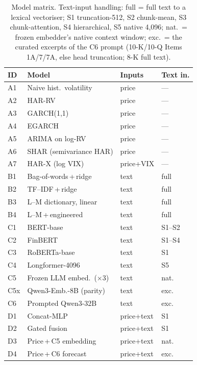 \begin{table}[t]
\centering
\small
\caption{Model matrix. Text-input handling: full = full text to a lexical vectoriser; S1 truncation-512, S2 chunk-mean, S3 chunk-attention, S4 hierarchical, S5 native 4{,}096; nat.\ = frozen embedder's native context window; exc.\ = the curated excerpts of the C6 prompt (10-K/10-Q Items 1A/7/7A, else head truncation; 8-K full text).}
\label{tab:models}
\setlength{\tabcolsep}{3pt}
\begin{tabular}{@{}llll@{}}
\toprule
\textbf{ID} & \textbf{Model} & \textbf{Inputs} & \textbf{Text in.} \\
\midrule
A1 & Naive hist.\ volatility & price & --- \\
A2 & HAR-RV & price & --- \\
A3 & GARCH(1,1) & price & --- \\
A4 & EGARCH & price & --- \\
A5 & ARIMA on log-RV & price & --- \\
A6 & SHAR (semivariance HAR) & price & --- \\
A7 & HAR-X (log VIX) & price+VIX & --- \\
\midrule
B1 & Bag-of-words\,+\,ridge & text & full \\
B2 & TF--IDF\,+\,ridge & text & full \\
B3 & L--M dictionary, linear & text & full \\
B4 & L--M\,+\,engineered & text & full \\
\midrule
C1 & BERT-base & text & S1--S2 \\
C2 & FinBERT & text & S1--S4 \\
C3 & RoBERTa-base & text & S1 \\
C4 & Longformer-4096 & text & S5 \\
C5 & Frozen LLM embed.\ ($\times$3) & text & nat. \\
C5x & Qwen3-Emb.-8B (parity) & text & exc. \\
C6 & Prompted Qwen3-32B & text & exc. \\
\midrule
D1 & Concat-MLP & price+text & S1 \\
D2 & Gated fusion & price+text & S1 \\
D3 & Price\,+\,C5 embedding & price+text & nat. \\
D4 & Price\,+\,C6 forecast & price+text & exc. \\
\bottomrule
\end{tabular}
\end{table}

